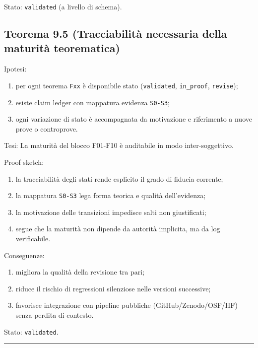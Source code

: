 Stato: \texttt{validated} (a livello di schema).

\subsection{Teorema 9.5 (Tracciabilità necessaria della maturità teorematica)}

Ipotesi:

\begin{enumerate}
\def\labelenumi{\arabic{enumi}.}
\tightlist
\item
  per ogni teorema \texttt{Fxx} è disponibile stato (\texttt{validated}, \texttt{in\_proof}, \texttt{revise});
\item
  esiste claim ledger con mappatura evidenza \texttt{S0-S3};
\item
  ogni variazione di stato è accompagnata da motivazione e riferimento a nuove prove o controprove.
\end{enumerate}

Tesi:
La maturità del blocco F01-F10 è auditabile in modo inter-soggettivo.

Proof sketch:

\begin{enumerate}
\def\labelenumi{\arabic{enumi}.}
\tightlist
\item
  la tracciabilità degli stati rende esplicito il grado di fiducia corrente;
\item
  la mappatura \texttt{S0-S3} lega forma teorica e qualità dell'evidenza;
\item
  la motivazione delle transizioni impedisce salti non giustificati;
\item
  segue che la maturità non dipende da autorità implicita, ma da log verificabile.
\end{enumerate}

Conseguenze:

\begin{enumerate}
\def\labelenumi{\arabic{enumi}.}
\tightlist
\item
  migliora la qualità della revisione tra pari;
\item
  riduce il rischio di regressioni silenziose nelle versioni successive;
\item
  favorisce integrazione con pipeline pubbliche (GitHub/Zenodo/OSF/HF) senza perdita di contesto.
\end{enumerate}

Stato: \texttt{validated}.

\begin{center}\rule{0.5\linewidth}{0.5pt}\end{center}

